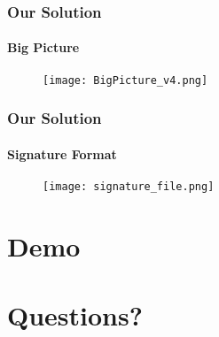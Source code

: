 \begin{frame}[t]\frametitle{Our Solution}
	\framesubtitle{Big Picture}
	\begin{figure}[ht]
		\centering
		\texttt{[image: BigPicture\_v4.png]}
	\end{figure}
\end{frame}


\begin{frame}[t]\frametitle{Our Solution}
	\framesubtitle{Signature Format}
	\begin{figure}[ht]
		\centering
		\texttt{[image: signature\_file.png]}
	\end{figure}
\end{frame}

\section{Demo}
\sectionpage

\section{Questions?}
\sectionpage